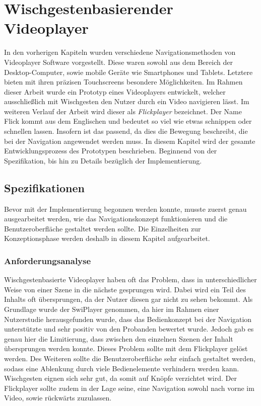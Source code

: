 \documentclass[11pt,a4paper]{report}
\begin{document}
\chapter{Wischgestenbasierender Videoplayer}

In den vorherigen Kapiteln wurden verschiedene Navigationsmethoden von Videoplayer  Software vorgestellt. Diese waren sowohl aus dem Bereich der Desktop-Computer, sowie mobile Geräte wie Smartphones und Tablets. Letztere bieten mit ihren präzisen Touchscreens besondere Möglichkeiten. Im Rahmen dieser Arbeit wurde ein Prototyp eines Videoplayers entwickelt, welcher ausschließlich mit Wischgesten den Nutzer durch ein Video navigieren lässt. Im weiteren Verlauf der Arbeit wird dieser als \emph{Flickplayer} bezeichnet. Der Name Flick kommt aus dem Englischen und bedeutet so viel wie etwas schnippen oder schnellen lassen. Insofern ist das passend, da dies die Bewegung beschreibt, die bei der Navigation angewendet werden muss. In diesem Kapitel wird der gesamte Entwicklungsprozess des Prototypen beschrieben. Beginnend von der Spezifikation, bis hin zu Details bezüglich der Implementierung.

\section{Spezifikationen}

Bevor mit der Implementierung begonnen werden konnte, musste zuerst genau ausgearbeitet werden, wie das Navigationskonzept funktionieren und die Benutzeroberfläche gestaltet werden sollte. Die Einzelheiten zur Konzeptionsphase werden deshalb in diesem Kapitel aufgearbeitet.

\subsection{Anforderungsanalyse}

Wischgestenbasierte Videoplayer haben oft das Problem, dass in unterschiedlicher Weise von einer Szene in die nächste gesprungen wird. Dabei wird ein Teil des Inhalts oft übersprungen, da der Nutzer diesen gar nicht zu sehen bekommt. Als Grundlage wurde der SwiPlayer \cite{schoeffmann2014video2} genommen, da hier im Rahmen einer Nutzerstudie herausgefunden wurde, dass das Bedienkonzept bei der Navigation unterstützte und sehr positiv von den Probanden bewertet wurde. Jedoch gab es genau hier die Limitierung, dass zwischen den einzelnen Szenen der Inhalt übersprungen werden konnte. Dieses Problem sollte mit dem Flickplayer gelöst werden. Des Weiteren sollte die Benutzeroberfläche sehr einfach gestaltet werden, sodass eine Ablenkung durch viele Bedienelemente verhindern werden kann. Wischgesten eignen sich sehr gut, da somit auf Knöpfe verzichtet wird. Der Flickplayer sollte zudem in der Lage seine, eine Navigation sowohl nach vorne im Video, sowie rückwärts zuzulassen.
\end{document}
